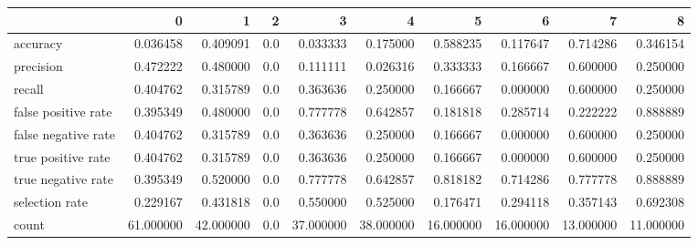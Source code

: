 \begin{tabular}{lrrrrrrrrr}
\toprule
{} &          0 &          1 &    2 &          3 &          4 &          5 &          6 &          7 &          8 \\
\midrule
accuracy            &   0.036458 &   0.409091 &  0.0 &   0.033333 &   0.175000 &   0.588235 &   0.117647 &   0.714286 &   0.346154 \\
precision           &   0.472222 &   0.480000 &  0.0 &   0.111111 &   0.026316 &   0.333333 &   0.166667 &   0.600000 &   0.250000 \\
recall              &   0.404762 &   0.315789 &  0.0 &   0.363636 &   0.250000 &   0.166667 &   0.000000 &   0.600000 &   0.250000 \\
false positive rate &   0.395349 &   0.480000 &  0.0 &   0.777778 &   0.642857 &   0.181818 &   0.285714 &   0.222222 &   0.888889 \\
false negative rate &   0.404762 &   0.315789 &  0.0 &   0.363636 &   0.250000 &   0.166667 &   0.000000 &   0.600000 &   0.250000 \\
true positive rate  &   0.404762 &   0.315789 &  0.0 &   0.363636 &   0.250000 &   0.166667 &   0.000000 &   0.600000 &   0.250000 \\
true negative rate  &   0.395349 &   0.520000 &  0.0 &   0.777778 &   0.642857 &   0.818182 &   0.714286 &   0.777778 &   0.888889 \\
selection rate      &   0.229167 &   0.431818 &  0.0 &   0.550000 &   0.525000 &   0.176471 &   0.294118 &   0.357143 &   0.692308 \\
count               &  61.000000 &  42.000000 &  0.0 &  37.000000 &  38.000000 &  16.000000 &  16.000000 &  13.000000 &  11.000000 \\
\bottomrule
\end{tabular}
